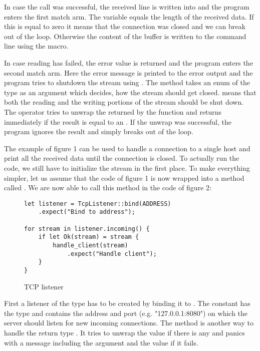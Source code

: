 In case the call was successful, the received line is written into  and the program enters the first match
arm. The variable  equals the length of the received data. If this is equal to zero it means that the
connection was closed and we can break out of the loop. Otherwise the content of the buffer is written to the command
line using the  macro.

In case reading has failed, the error value is returned and the program enters the second match arm. Here the error
message is printed to the error output and the program tries to shutdown the stream using
. The method takes an enum of the type  as an argument which
decides, how the stream should get closed.  means that both the reading and the writing portions of the
stream should be shut down. The  operator tries to unwrap the  returned by the function and
returns immediately if the result is equal to an . If the unwrap was successful, the program ignores the
result and simply breaks out of the loop.

The example of figure 1 can be used to handle a connection to a single host and print all the received data until the
connection is closed. To actually run the code, we still have to initialize the stream in the first place. To make
everything simpler, let us assume that the code of figure 1 is now wrapped into a method called
. We are now able to call this method in the code of figure 2:

\begin{figure}[h]
    \begin{verbatim}
let listener = TcpListener::bind(ADDRESS)
    .expect("Bind to address");

for stream in listener.incoming() {
    if let Ok(stream) = stream {
        handle_client(stream)
            .expect("Handle client");
    }
}
    \end{verbatim}
    \caption{TCP listener}
\end{figure}

First a listener of the type  has to be created by binding it to . The
constant  has the type  and contains the address and port (e.g. "127.0.0.1:8080") on which the
server should listen for new incoming connections. The method  is another way to handle the return type
. It tries to unwrap the  value if there is any and panics with a message including the argument
and the  value if it fails.

